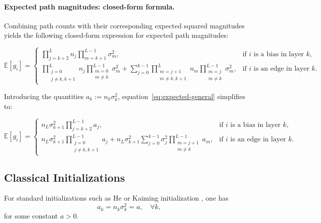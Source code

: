 \documentclass{article}
\theoremstyle{plain}
\theoremstyle{definition}
\theoremstyle{remark}
\begin{document}
\paragraph{Expected path magnitudes: closed-form formula.}
Combining path counts with their corresponding expected squared magnitudes yields the following closed-form expression for expected path magnitudes:


\begin{equation}
\label{eq:expected-general}
\mathbb{E}[g_i] =
\begin{cases}
\displaystyle
\prod_{j=k+2}^{L} n_j \prod_{m=k+1}^{L-1} \sigma_m^2,
& \text{if $i$ is a bias in layer $k$,}\\[8pt]
\displaystyle
\prod_{\substack{j=0 \\ j \neq k, k+1}}^{L} n_j \prod_{\substack{m=0 \\ m \neq k}}^{L-1} \sigma_m^2
+ \sum_{j=0}^{k-1} \prod_{\substack{m=j+1 \\ m \neq k, k+1}}^{L} n_m \prod_{\substack{m=j \\ m \neq k}}^{L-1} \sigma_m^2,
& \text{if $i$ is an edge in layer $k$.}
\end{cases}
\end{equation}

Introducing the quantities $a_k := n_k \sigma_k^2$, equation~\eqref{eq:expected-general} simplifies to:

\begin{equation}
\label{eq:expected-ak}
\mathbb{E}[g_i] =
\begin{cases}
\displaystyle
n_L \sigma_{k+1}^2 \prod_{j=k+2}^{L-1} a_j,
& \text{if $i$ is a bias in layer $k$,}\\[8pt]
\displaystyle
n_L \sigma_{k+1}^2 \prod_{\substack{j=0 \\ j \neq k, k+1}}^{L-1} a_j
+ n_L \sigma_{k+1}^2 \sum_{j=0}^{k-1} \sigma_j^2 \prod_{\substack{m=j+1 \\ m \neq k}}^{L-1} a_m,
& \text{if $i$ is an edge in layer $k$.}
\end{cases}
\end{equation}

\subsection{Classical Initializations}

For standard initializations such as He or Kaiming initialization \citep{he2015delving}, one has
\[
a_k = n_k \sigma_k^2 = a, \quad \forall k,
\]
for some constant $a > 0$.
\end{document}
